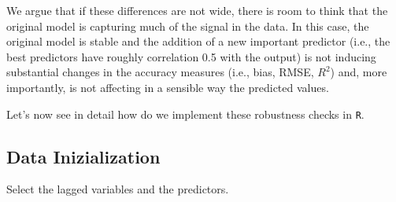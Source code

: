\documentclass[]{article}
\begin{document}
\par

We argue that if these differences are not wide, there is room to think
that the original model is capturing much of the signal in the data. In
this case, the original model is stable and the addition of a new
important predictor (i.e., the best predictors have roughly correlation
0.5 with the output) is not inducing substantial changes in the accuracy
measures (i.e., bias, RMSE, \(R^2\)) and, more importantly, is not
affecting in a sensible way the predicted values.

\par

Let's now see in detail how do we implement these robustness checks in
\texttt{R}.

\hypertarget{data-inizialization}{%
\subsection{Data Inizialization}\label{data-inizialization}}

Select the lagged variables and the predictors.
\end{document}
